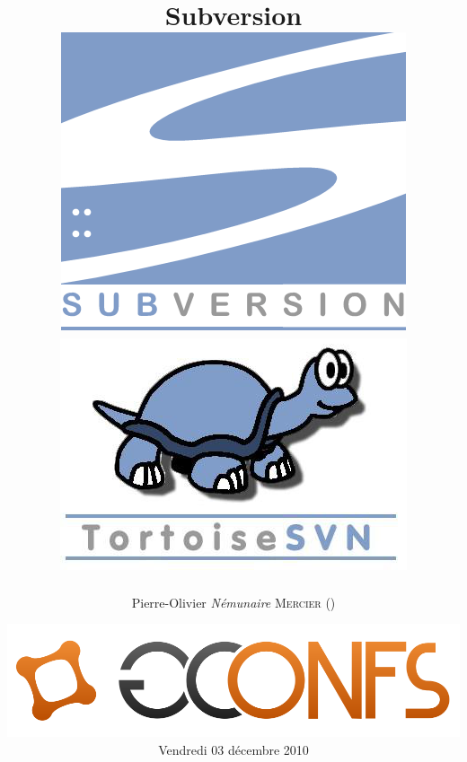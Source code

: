 \documentclass[12pt,a4paper]{report}
\begin{document}
\title{
  \vspace{1cm}
  \textbf{\Huge{\Tp{} Subversion}}\\
  \vspace{1.5cm}
  \includegraphics[scale=5]{images/logo_svn.png}
  \hspace{1cm}
  \includegraphics[scale=0.5]{images/logo_tortoise.png}
}
\author{
  Pierre-Olivier \textit{Némunaire} \textsc{Mercier} ()\\
}
\date{
  \includegraphics[scale=0.5]{images/gconfs.png}\\
  \vspace{1cm}
  Vendredi 03 décembre 2010
}

\maketitle
\end{document}
